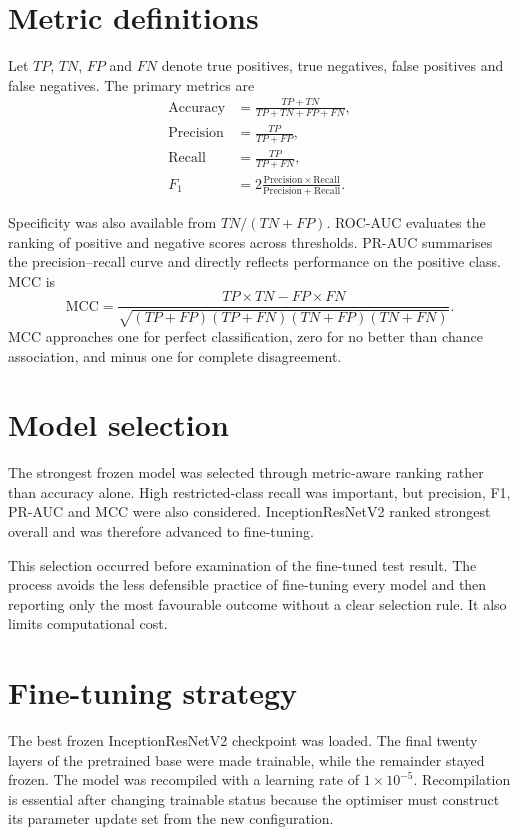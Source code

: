\section{Metric definitions}
Let $TP$, $TN$, $FP$ and $FN$ denote true positives, true negatives, false positives and false negatives. The primary metrics are
\begin{align}
\mathrm{Accuracy}&=\frac{TP+TN}{TP+TN+FP+FN},\\
\mathrm{Precision}&=\frac{TP}{TP+FP},\\
\mathrm{Recall}&=\frac{TP}{TP+FN},\\
F_1&=2\frac{\mathrm{Precision}\times\mathrm{Recall}}{\mathrm{Precision}+\mathrm{Recall}}.
\end{align}

Specificity was also available from $TN/(TN+FP)$. ROC-AUC evaluates the ranking of positive and negative scores across thresholds. PR-AUC summarises the precision--recall curve and directly reflects performance on the positive class. MCC is
\begin{equation}
\mathrm{MCC}=\frac{TP\times TN-FP\times FN}{\sqrt{(TP+FP)(TP+FN)(TN+FP)(TN+FN)}}.
\end{equation}
MCC approaches one for perfect classification, zero for no better than chance association, and minus one for complete disagreement.

\section{Model selection}
The strongest frozen model was selected through metric-aware ranking rather than accuracy alone. High restricted-class recall was important, but precision, F1, PR-AUC and MCC were also considered. InceptionResNetV2 ranked strongest overall and was therefore advanced to fine-tuning.

This selection occurred before examination of the fine-tuned test result. The process avoids the less defensible practice of fine-tuning every model and then reporting only the most favourable outcome without a clear selection rule. It also limits computational cost.

\section{Fine-tuning strategy}
The best frozen InceptionResNetV2 checkpoint was loaded. The final twenty layers of the pretrained base were made trainable, while the remainder stayed frozen. The model was recompiled with a learning rate of $1\times10^{-5}$. Recompilation is essential after changing trainable status because the optimiser must construct its parameter update set from the new configuration.

